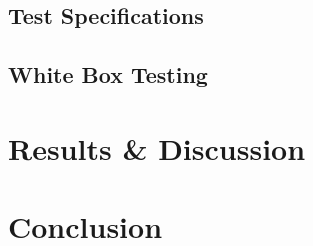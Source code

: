 \documentclass[paper=a4, fontsize=12pt,DIV=14]{scrartcl}    %
\begin{document}
        	\subsection{Test Specifications}
        	\subsection{White Box Testing}



    \newpage
        \section{Results \& Discussion}



    \newpage
        \section{Conclusion}



\end{document}
